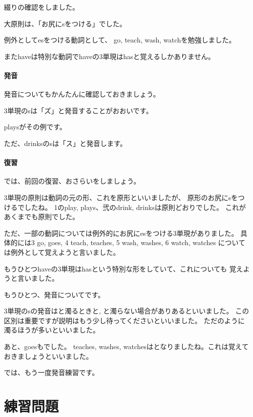 \documentclass[book,jafontscale=0.9247]{jlreq}
\let\textipa\relax
\begin{document}
綴りの確認をしました。

大原則は、「お尻にsをつける」でした。

例外としてesをつける動詞として、
go, teach, wash, watchを勉強しました。

またhaveは特別な動詞でhaveの3単現はhasと覚えるしかありません。

\paragraph{発音}

発音についてもかんたんに確認しておきましょう。

3単現のsは「ズ」と発音することがおおいです。

playsがその例です。

ただ、drinksのsは「ス」と発音します。

\paragraph{復習}

では、前回の復習、おさらいをしましょう。

3単現の原則は動詞の元の形、これを原形といいましたが、
原形のお尻にsをつけるでしたね。
1のplay, plays、弐のdrink, drinksは原則どおりでした。
これがあくまでも原則でした。


ただ、一部の動詞については例外的にお尻にesをつける3単現がありました。
具体的には3 go, goes, 4 teach, teaches, 5 wash, washes, 6 watch, watches
については例外として覚えようと言いました。

もうひとつhaveの3単現はhasという特別な形をしていて、これについても
覚えようと言いました。

もうひとつ、発音についてです。

3単現のsの発音は\textipa{/z/}と濁るときと, \textipa{/s/}と濁らない場合がありあるといいました。
この区別は重要ですが説明はもう少し待ってくださいといいました。
ただ\textipa{/z/}のように濁るほうが多いといいました。

あと、goesも\textipa{/z/}でした。
teaches, washes, watchesは\textipa{/iz/}となりましたね。これは覚えておきましょうといいました。

では、もう一度発音練習です。



\section{練習問題}
\end{document}
